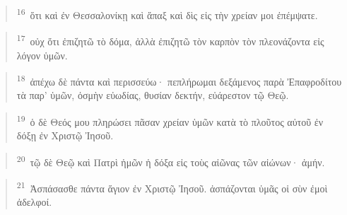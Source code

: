 \documentclass{article}
\newcommand{\currentverse}{1} %
\newcommand{\setcurrentverse}[1]{\renewcommand{\currentverse}{#1}}
\begin{document}
\begin{verse}

\setcurrentverse{16}

\setcounter{footnote}{0}

\textsuperscript{16}~ὅτι καὶ ἐν Θεσσαλονίκῃ καὶ ἅπαξ καὶ δὶς εἰς τὴν χρείαν μοι ἐπέμψατε.

\end{verse}

\begin{verse}

\setcurrentverse{17}

\setcounter{footnote}{0}

\textsuperscript{17}~οὐχ ὅτι ἐπιζητῶ τὸ δόμα, ἀλλὰ ἐπιζητῶ τὸν καρπὸν τὸν πλεονάζοντα εἰς λόγον ὑμῶν.

\end{verse}

\begin{verse}

\setcurrentverse{18}

\setcounter{footnote}{0}

\textsuperscript{18}~ἀπέχω δὲ πάντα καὶ περισσεύω· πεπλήρωμαι δεξάμενος παρὰ Ἐπαφροδίτου τὰ παρ’ ὑμῶν, ὀσμὴν εὐωδίας, θυσίαν δεκτήν, εὐάρεστον τῷ Θεῷ.

\end{verse}

\begin{verse}

\setcurrentverse{19}

\setcounter{footnote}{0}

\textsuperscript{19}~ὁ δὲ Θεός μου πληρώσει πᾶσαν χρείαν ὑμῶν κατὰ τὸ πλοῦτος αὐτοῦ ἐν δόξῃ ἐν Χριστῷ Ἰησοῦ.

\end{verse}

\begin{verse}

\setcurrentverse{20}

\setcounter{footnote}{0}

\textsuperscript{20}~τῷ δὲ Θεῷ καὶ Πατρὶ ἡμῶν ἡ δόξα εἰς τοὺς αἰῶνας τῶν αἰώνων· ἀμήν.

\end{verse}

\begin{verse}

\setcurrentverse{21}

\setcounter{footnote}{0}

\textsuperscript{21}~Ἀσπάσασθε πάντα ἅγιον ἐν Χριστῷ Ἰησοῦ. ἀσπάζονται ὑμᾶς οἱ σὺν ἐμοὶ ἀδελφοί.

\end{verse}
\end{document}
